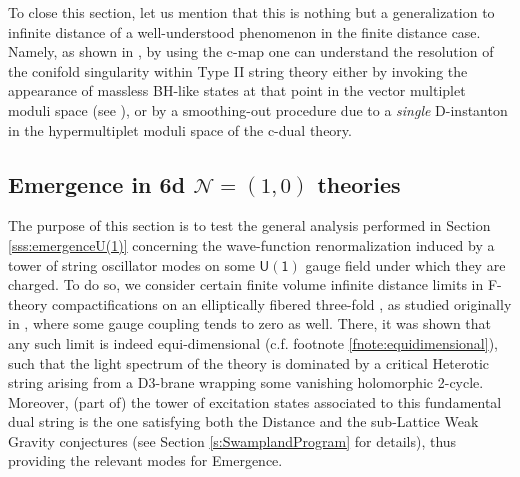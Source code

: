 To close this section, let us mention that this is nothing but a generalization to infinite distance of a well-understood phenomenon in the finite distance case. Namely, as shown in \cite{Ooguri:1996me}, by using the c-map one can understand the resolution of the conifold singularity within Type II string theory either by invoking the appearance of massless BH-like states at that point in the vector multiplet moduli space (see \cite{Strominger:1995cz}), or by a smoothing-out procedure due to a \emph{single} D-instanton in the hypermultiplet moduli space of the c-dual theory.

		
\subsection{Emergence in 6d $\mathcal{N}=(1,0)$ theories}
\label{ss:emergence6d}
		
The purpose of this section is to test the general analysis performed in Section \ref{sss:emergenceU(1)} concerning the wave-function renormalization induced by a tower of string oscillator modes on some $\mathsf{U(1)}$ gauge field under which they are charged. To do so, we consider certain finite volume infinite distance limits in F-theory compactifications on an elliptically fibered three-fold \cite{Vafa:1996xn,Morrison:1996na,Morrison:1996pp}, as studied originally in \cite{Lee:2018urn}, where some gauge coupling tends to zero as well. There, it was shown that any such limit is indeed equi-dimensional (c.f. footnote \ref{fnote:equidimensional}), such that the light spectrum of the theory is dominated by a critical Heterotic string arising from a D3-brane wrapping some vanishing holomorphic 2-cycle. Moreover, (part of) the tower of excitation states associated to this fundamental dual string is the one satisfying both the Distance and the sub-Lattice Weak Gravity conjectures (see Section \ref{s:SwamplandProgram} for details), thus providing the relevant modes for Emergence.  

